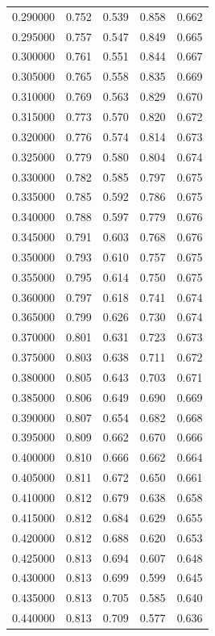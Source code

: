 \begin{table}[htbp]
\begin{tabular}{lllll}
0.290000 & 0.752 & 0.539 & 0.858 & 0.662 \\
0.295000 & 0.757 & 0.547 & 0.849 & 0.665 \\
0.300000 & 0.761 & 0.551 & 0.844 & 0.667 \\
0.305000 & 0.765 & 0.558 & 0.835 & 0.669 \\
0.310000 & 0.769 & 0.563 & 0.829 & 0.670 \\
0.315000 & 0.773 & 0.570 & 0.820 & 0.672 \\
0.320000 & 0.776 & 0.574 & 0.814 & 0.673 \\
0.325000 & 0.779 & 0.580 & 0.804 & 0.674 \\
0.330000 & 0.782 & 0.585 & 0.797 & 0.675 \\
0.335000 & 0.785 & 0.592 & 0.786 & 0.675 \\
0.340000 & 0.788 & 0.597 & 0.779 & 0.676 \\
0.345000 & 0.791 & 0.603 & 0.768 & 0.676 \\
0.350000 & 0.793 & 0.610 & 0.757 & 0.675 \\
0.355000 & 0.795 & 0.614 & 0.750 & 0.675 \\
0.360000 & 0.797 & 0.618 & 0.741 & 0.674 \\
0.365000 & 0.799 & 0.626 & 0.730 & 0.674 \\
0.370000 & 0.801 & 0.631 & 0.723 & 0.673 \\
0.375000 & 0.803 & 0.638 & 0.711 & 0.672 \\
0.380000 & 0.805 & 0.643 & 0.703 & 0.671 \\
0.385000 & 0.806 & 0.649 & 0.690 & 0.669 \\
0.390000 & 0.807 & 0.654 & 0.682 & 0.668 \\
0.395000 & 0.809 & 0.662 & 0.670 & 0.666 \\
0.400000 & 0.810 & 0.666 & 0.662 & 0.664 \\
0.405000 & 0.811 & 0.672 & 0.650 & 0.661 \\
0.410000 & 0.812 & 0.679 & 0.638 & 0.658 \\
0.415000 & 0.812 & 0.684 & 0.629 & 0.655 \\
0.420000 & 0.812 & 0.688 & 0.620 & 0.653 \\
0.425000 & 0.813 & 0.694 & 0.607 & 0.648 \\
0.430000 & 0.813 & 0.699 & 0.599 & 0.645 \\
0.435000 & 0.813 & 0.705 & 0.585 & 0.640 \\
0.440000 & 0.813 & 0.709 & 0.577 & 0.636 \\

\end{tabular}
\end{table}
